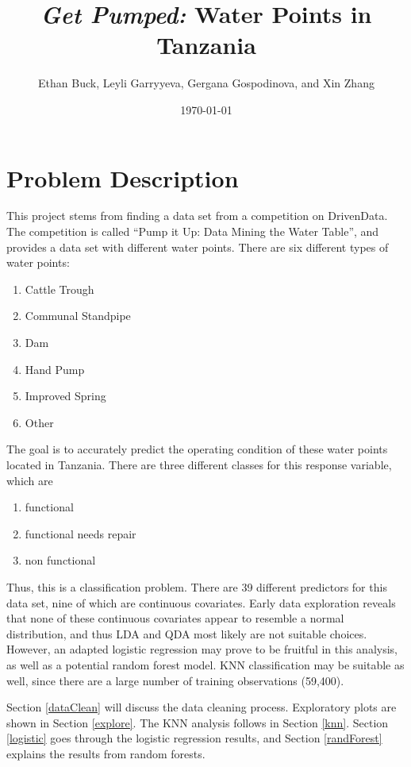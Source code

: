 \documentclass{article}
\title{\textit{Get Pumped:} Water Points in Tanzania}
\author{Ethan Buck, Leyli Garryyeva, Gergana Gospodinova, and Xin Zhang}
\date{\today}
\begin{document}
\maketitle

\section{Problem Description}
This project stems from finding a data set from a competition on DrivenData.  The competition is called ``Pump it Up: Data Mining the Water Table'', and provides a data set with different water points.  There are six different types of water points:

\begin{enumerate}
    \item Cattle Trough
    \item Communal Standpipe
    \item Dam
    \item Hand Pump
    \item Improved Spring
    \item Other
\end{enumerate}

The goal is to accurately predict the operating condition of these water points located in Tanzania.  There are three different classes for this response variable, which are

\begin{enumerate}
    \item functional
    \item functional needs repair
    \item non functional
\end{enumerate}

Thus, this is a classification problem.  There are 39 different predictors for this data set, nine of which are continuous covariates.  Early data exploration reveals that none of these continuous covariates appear to resemble a normal distribution, and thus LDA and QDA most likely are not suitable choices.  However, an adapted logistic regression may prove to be fruitful in this analysis, as well as a potential random forest model.  KNN classification may be suitable as well, since there are a large number of training observations (59,400).

Section \ref{dataClean} will discuss the data cleaning process.  Exploratory plots are shown in Section \ref{explore}.  The KNN analysis follows in Section \ref{knn}.  Section \ref{logistic} goes through the logistic regression results, and Section \ref{randForest} explains the results from random forests.
\end{document}
